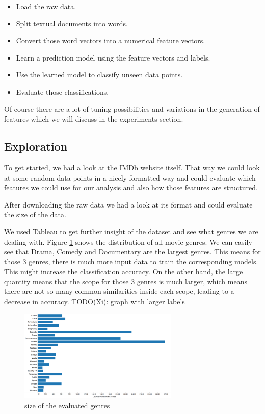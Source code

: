 \documentclass{vldb}
\begin{document}
\begin{itemize}
\item {Load the raw data.}
\item {Split textual documents into words.}
\item {Convert those word vectors into a numerical feature vectors.}
\item {Learn a prediction model using the feature vectors and labels.}
\item {Use the learned model to classify unseen data points.}
\item {Evaluate those classifications.}
\end{itemize}

\par Of course there are a lot of tuning possibilities and variations in the generation of features which we will discuss in the experiments section.

\subsection{Exploration}
\par To get started, we had a look at the IMDb website itself. That way we could look at some random data points in a nicely formatted way and could evaluate which features we could use for our analysis and also how those features are structured. 
\par After downloading the raw data we had a look at its format and could evaluate the size of the data.
\par We used Tableau to get further insight of the dataset and see what genres we are dealing with. Figure \ref{fig:tableau} shows the distribution of all movie genres. We can easily see that Drama, Comedy and Documentary are the largest genres. This means for those 3 genres, there is much more input data to train the corresponding models. This might increase the classification accuracy. On the other hand, the large quantity means that the scope for those 3 genres is much larger, which means there are not so many common similarities inside each scope, leading to a decrease in accuracy.
TODO(Xi): graph with larger labels
\begin{figure}
\begin{center}
\includegraphics[width=3.00in]{genresContribution.png}
\caption{size of the evaluated genres}
\label{fig:tableau}
\end{center}
\end{figure} 
\end{document}
